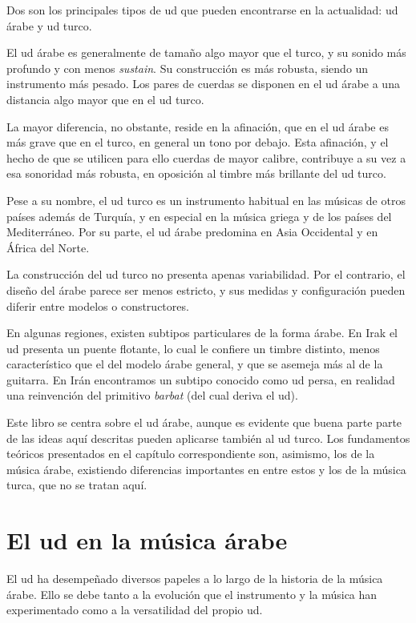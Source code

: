 Dos son los principales tipos de ud que pueden encontrarse en la actualidad: ud árabe y ud turco.

El ud árabe es generalmente de tamaño algo mayor que el turco, y su sonido más profundo y con menos \emph{sustain}. Su construcción es más robusta, siendo un instrumento más pesado. Los pares de cuerdas se disponen en el ud árabe a una distancia algo mayor que en el ud turco.

La mayor diferencia, no obstante, reside en la afinación, que en el ud árabe es más grave que en el turco, en general un tono por debajo. Esta afinación, y el hecho de que se utilicen para ello cuerdas de mayor calibre, contribuye a su vez a esa sonoridad más robusta, en oposición al timbre más brillante del ud turco.

Pese a su nombre, el ud turco es un instrumento habitual en las músicas de otros países además de Turquía, y en especial en la música griega y de los países del Mediterráneo. Por su parte, el ud árabe predomina en Asia Occidental y en África del Norte.

La construcción del ud turco no presenta apenas variabilidad. Por el contrario, el diseño del árabe parece ser menos estricto, y sus medidas y configuración pueden diferir entre modelos o constructores.

En algunas regiones, existen subtipos particulares de la forma árabe. En Irak el ud presenta un puente flotante, lo cual le confiere un timbre distinto, menos característico que el del modelo árabe general, y que se asemeja más al de la guitarra. En Irán encontramos un subtipo conocido como ud persa, en realidad una reinvención del primitivo \emph{barbat} (del cual deriva el ud).

Este libro se centra sobre el ud árabe, aunque es evidente que buena parte parte de las ideas aquí descritas pueden aplicarse también al ud turco. Los fundamentos teóricos presentados en el capítulo correspondiente son, asimismo, los de la música árabe, existiendo diferencias importantes en entre estos y los de la música turca, que no se tratan aquí.

\section{El ud en la música árabe}

El ud ha desempeñado diversos papeles a lo largo de la historia de la música árabe. Ello se debe tanto a la evolución que el instrumento y la música han experimentado como a la versatilidad del propio ud.


